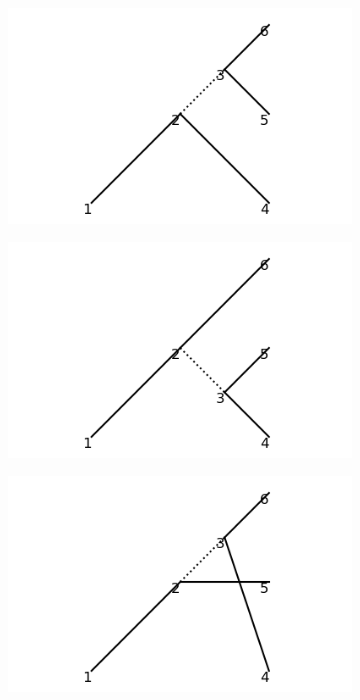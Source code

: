\documentclass[11pt,a4paper,twoside,pdf]{article}
\numberwithin{equation}{section}
\begin{document}
\begin{figure}[h!]
    \centering
    \begin{subfigure}[t]{0.33\textwidth}
        \centering
        \includegraphics[width=\textwidth]{plots/canonical/order2/9.png}
        \caption{ }
    \end{subfigure}%
    \begin{subfigure}[t]{0.33\textwidth}
        \centering
        \includegraphics[width=\textwidth]{plots/canonical/order2/10.png}
        \caption{ }
    \end{subfigure}
    \begin{subfigure}[t]{0.33\textwidth}
        \centering
        \includegraphics[width=\textwidth]{plots/canonical/order2/11.png}

\end{subfigure}
\end{figure}
\end{document}
